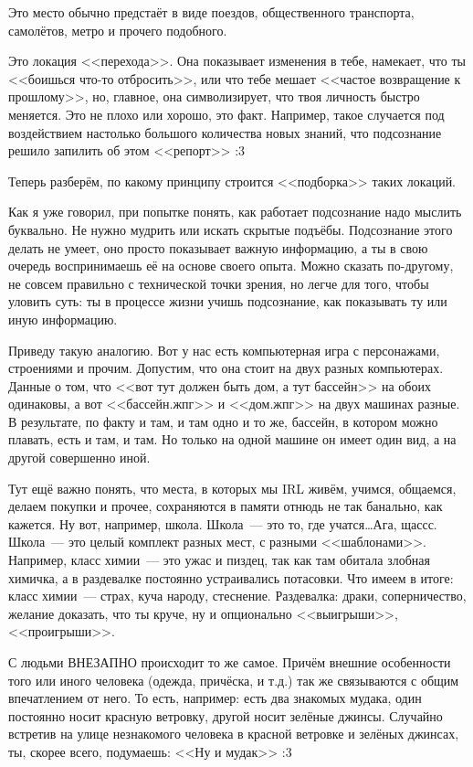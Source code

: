 \documentclass[a4paper,14pt,oneside]{memoir}
\begin{document}
Это место обычно предстаёт в виде поездов, общественного транспорта, самолётов, метро и прочего подобного. 

Это локация <<перехода>>. Она показывает изменения в тебе, намекает, что ты <<боишься что-то отбросить>>, или что тебе мешает <<частое возвращение к прошлому>>, но, главное, она символизирует, что твоя личность быстро меняется. Это не плохо или хорошо, это факт. Например, такое случается под воздействием настолько большого количества новых знаний, что подсознание решило запилить об этом <<репорт>> :3
   
Теперь разберём, по какому принципу строится <<подборка>> таких локаций.
 
Как я уже говорил, при попытке понять, как работает подсознание надо мыслить буквально. Не нужно мудрить или искать скрытые подъёбы. Подсознание этого делать не умеет, оно просто показывает важную информацию, а ты в свою очередь воспринимаешь её на основе своего опыта. Можно сказать по-другому, не совсем правильно с технической точки зрения, но легче для того, чтобы уловить суть: ты в процессе жизни учишь подсознание, как показывать ту или иную информацию.
   
Приведу такую аналогию. Вот у нас есть компьютерная игра с персонажами, строениями и прочим. Допустим, что она стоит на двух разных компьютерах. Данные о том, что <<вот тут должен быть дом, а тут бассейн>> на обоих одинаковы, а вот <<бассейн.жпг>> и <<дом.жпг>> на двух машинах разные. В результате, по факту и там, и там одно и то же, бассейн, в котором можно плавать, есть и там, и там. Но только на одной машине он имеет один вид, а на другой совершенно иной. 

Тут ещё важно понять, что места, в которых мы IRL живём, учимся, общаемся, делаем покупки и прочее, сохраняются в памяти отнюдь не так банально, как кажется. Ну вот, например, школа. Школа~--- это то, где учатся\ldots Ага, щассс. Школа~--- это целый комплект разных мест, с разными <<шаблонами>>. Например, класс химии~--- это ужас и пиздец, так как там обитала злобная химичка, а в раздевалке постоянно устраивались потасовки. Что имеем в итоге: класс химии~--- страх, куча народу, стеснение. Раздевалка: драки, соперничество, желание доказать, что ты круче, ну и опционально <<выигрыши>>, <<проигрыши>>.
 
С людьми ВНЕЗАПНО происходит то же самое. Причём внешние особенности того или иного человека (одежда, причёска, и т.д.) так же связываются с общим впечатлением от него. То есть, например: есть два знакомых мудака, один постоянно носит красную ветровку, другой носит зелёные джинсы. Случайно встретив на улице незнакомого человека в красной ветровке и зелёных джинсах, ты, скорее всего, подумаешь: <<Ну и мудак>> :3 
\end{document}

